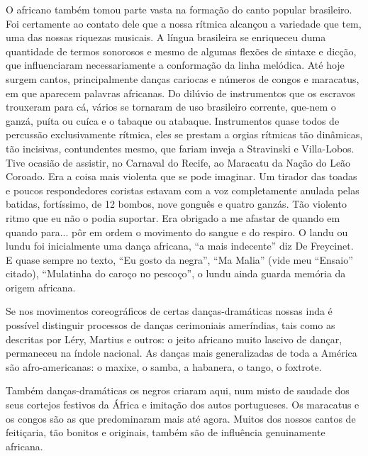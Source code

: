 O africano também tomou parte vasta na formação do canto popular
brasileiro. Foi certamente ao contato dele que a nossa rítmica alcançou
a variedade que tem, uma das nossas riquezas musicais. A língua
brasileira se enriqueceu duma quantidade de termos sonorosos e mesmo de
algumas flexões de sintaxe e dicção, que influenciaram necessariamente a
conformação da linha melódica. Até hoje surgem cantos, principalmente
danças cariocas e números de congos e maracatus, em que aparecem
palavras africanas. Do dilúvio de instrumentos que os escravos trouxeram
para cá, vários se tornaram de uso brasileiro corrente, que-nem o ganzá,
puíta ou cuíca e o tabaque ou atabaque. Instrumentos quase todos de
percussão exclusivamente rítmica, eles se prestam a orgias rítmicas tão
dinâmicas, tão incisivas, contundentes mesmo, que fariam inveja a
Stravinski e Villa-Lobos. Tive ocasião de assistir, no Carnaval do
Recife, ao Maracatu da Nação do Leão Coroado. Era a coisa mais violenta
que se pode imaginar. Um tirador das toadas e poucos respondedores
coristas estavam com a voz completamente anulada pelas batidas,
fortíssimo, de 12 bombos, nove gonguês e quatro ganzás. Tão violento
ritmo que eu não o podia suportar. Era obrigado a me afastar de quando
em quando para... pôr em ordem o movimento do sangue e do respiro. O
landu ou lundu foi inicialmente uma dança africana, ``a mais indecente''
diz De Freycinet. E quase sempre no texto, ``Eu gosto da negra'', ``Ma
Malia'' (vide meu ``Ensaio'' citado), ``Mulatinha do caroço no
pescoço'', o lundu ainda guarda memória da origem africana.

Se nos movimentos coreográficos de certas danças-dramáticas nossas inda
é possível distinguir processos de danças cerimoniais ameríndias, tais
como as descritas por Léry, Martius e outros: o jeito africano muito
lascivo de dançar, permaneceu na índole nacional. As danças mais
generalizadas de toda a América são afro-americanas: o maxixe, o samba,
a habanera, o tango, o foxtrote.

Também danças-dramáticas os negros criaram aqui, num misto de saudade
dos seus cortejos festivos da África e imitação dos autos portugueses.
Os maracatus e os congos são as que predominaram mais até agora. Muitos
dos nossos cantos de feitiçaria, tão bonitos e originais, também são de
influência genuinamente africana.

